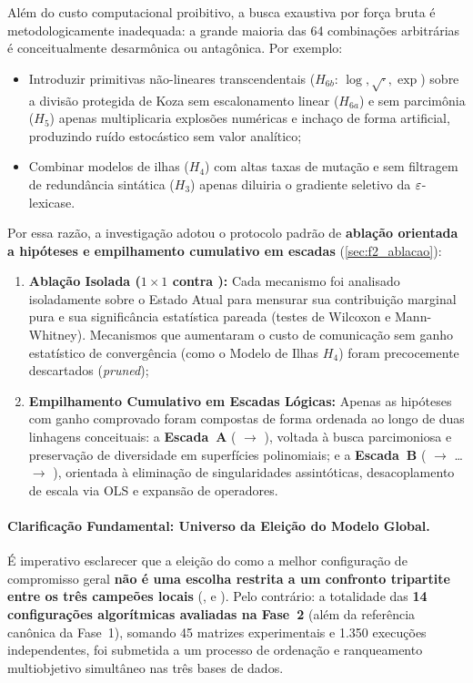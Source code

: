 Além do custo computacional proibitivo, a busca exaustiva por força bruta é
metodologicamente inadequada: a grande maioria das 64 combinações arbitrárias é
conceitualmente desarmônica ou antagônica. Por exemplo:
\begin{itemize}
  \item Introduzir primitivas não-lineares transcendentais ($H_{6b}$: $\log, \sqrt{\cdot}, \exp$)
        sobre a divisão protegida de Koza sem escalonamento linear ($H_{6a}$) e sem
        parcimônia ($H_5$) apenas multiplicaria explosões numéricas e inchaço de forma
        artificial, produzindo ruído estocástico sem valor analítico;
  \item Combinar modelos de ilhas ($H_4$) com altas taxas de mutação e sem filtragem
        de redundância sintática ($H_3$) apenas diluiria o gradiente seletivo da $\varepsilon$-lexicase.
\end{itemize}

Por essa razão, a investigação adotou o protocolo padrão de \textbf{ablação
orientada a hipóteses e empilhamento cumulativo em escadas}
(\cref{sec:f2_ablacao}):
\begin{enumerate}
  \item \textbf{Ablação Isolada ($1 \times 1$ contra ):} Cada mecanismo foi
        analisado isoladamente sobre o Estado Atual  para mensurar sua
        contribuição marginal pura e sua significância estatística pareada
        (testes de Wilcoxon e Mann-Whitney). Mecanismos que aumentaram o custo de
        comunicação sem ganho estatístico de convergência (como o Modelo de Ilhas
        $H_4$) foram precocemente descartados (\emph{pruned});
  \item \textbf{Empilhamento Cumulativo em Escadas Lógicas:} Apenas as hipóteses com
        ganho comprovado foram compostas de forma ordenada ao longo de duas
        linhagens conceituais: a \textbf{Escada~A} ( $\to$ ),
        voltada à busca parcimoniosa e preservação de diversidade em superfícies
        polinomiais; e a \textbf{Escada~B} ( $\to$ \dots $\to$ ),
        orientada à eliminação de singularidades assintóticas, desacoplamento de escala
        via OLS e expansão de operadores.
\end{enumerate}

\paragraph{Clarificação Fundamental: Universo da Eleição do Modelo Global.}
É imperativo esclarecer que a eleição do \textbf{} como a melhor
configuração de compromisso geral \textbf{não é uma escolha restrita a um
confronto tripartite entre os três campeões locais} (, 
e ). Pelo contrário: a totalidade das \textbf{14 configurações
algorítmicas avaliadas na Fase~2} (além da referência canônica da Fase~1),
somando 45 matrizes experimentais e 1.350 execuções independentes, foi submetida
a um processo de ordenação e ranqueamento multiobjetivo simultâneo nas três bases
de dados.

